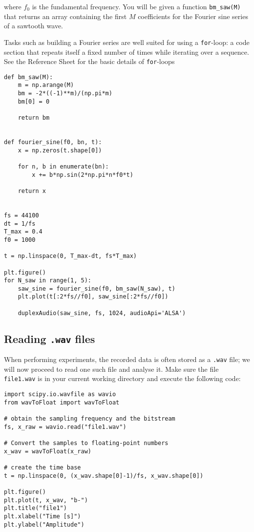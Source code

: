 where $f_0$ is the fundamental frequency. You will be given a function {\tt bm\_saw(M)} that returns an array containing the first $M$ coefficients for the Fourier sine series of a sawtooth wave.

Tasks such as building a Fourier series are well suited for using a {\tt for}-loop: a code section that repeats itself a fixed number of times while iterating over a sequence. See the Reference Sheet for the basic details of {\tt for}-loops

\begin{lstlisting}[frame=single]
def bm_saw(M):
    m = np.arange(M)
    bm = -2*((-1)**m)/(np.pi*m)
    bm[0] = 0

    return bm


def fourier_sine(f0, bn, t):
    x = np.zeros(t.shape[0])

    for n, b in enumerate(bn):
        x += b*np.sin(2*np.pi*n*f0*t)

    return x


fs = 44100
dt = 1/fs
T_max = 0.4
f0 = 1000

t = np.linspace(0, T_max-dt, fs*T_max)

plt.figure()
for N_saw in range(1, 5):
    saw_sine = fourier_sine(f0, bm_saw(N_saw), t)
    plt.plot(t[:2*fs//f0], saw_sine[:2*fs//f0])

    duplexAudio(saw_sine, fs, 1024, audioApi='ALSA')
\end{lstlisting}


\subsection{Reading {\tt .wav} files}

When performing experiments, the recorded data is often stored as a {\tt .wav} file; we will now proceed to read one such file and analyse it. Make sure the file {\tt file1.wav} is in your current working directory and execute the following code:

\begin{lstlisting}[frame=single]
import scipy.io.wavfile as wavio
from wavToFloat import wavToFloat

# obtain the sampling frequency and the bitstream
fs, x_raw = wavio.read("file1.wav")

# Convert the samples to floating-point numbers
x_wav = wavToFloat(x_raw)

# create the time base
t = np.linspace(0, (x_wav.shape[0]-1)/fs, x_wav.shape[0])

plt.figure()
plt.plot(t, x_wav, "b-")
plt.title("file1")
plt.xlabel("Time [s]")
plt.ylabel("Amplitude")
\end{lstlisting}

